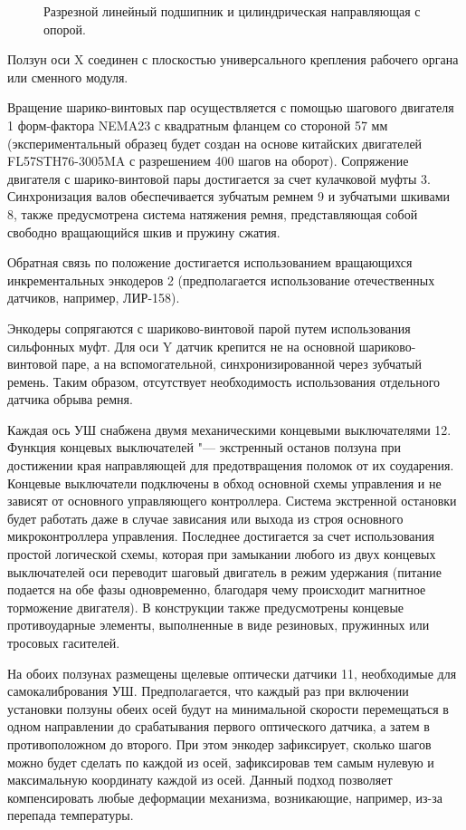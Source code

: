 \begin{figure}[ht]
	\caption{Разрезной линейный подшипник и цилиндрическая направляющая с опорой.}\label{fig:bearing}
\end{figure}

Ползун оси X соединен с плоскостью универсального крепления рабочего органа или сменного модуля.

Вращение шарико-винтовых пар осуществляется с помощью шагового двигателя 1 форм-фактора NEMA23 с квадратным фланцем со стороной 57 мм (экспериментальный образец будет создан на основе китайских двигателей FL57STH76-3005MA с разрешением 400 шагов на оборот). Сопряжение двигателя с шарико-винтовой пары достигается за счет кулачковой муфты 3. Синхронизация валов обеспечивается зубчатым ремнем 9 и зубчатыми шкивами 8, также предусмотрена система натяжения ремня, представляющая собой свободно вращающийся шкив и пружину сжатия.

Обратная связь по положение достигается использованием вращающихся инкрементальных энкодеров 2 (предполагается использование отечественных датчиков, например, ЛИР-158).

Энкодеры сопрягаются с шариково-винтовой парой путем использования сильфонных муфт. Для оси Y датчик крепится не на основной шариково-винтовой паре, а на вспомогательной, синхронизированной через зубчатый ремень. Таким образом, отсутствует необходимость использования отдельного датчика обрыва ремня. 

Каждая ось УШ снабжена двумя механическими концевыми выключателями 12. Функция концевых выключателей "--- экстренный останов ползуна при достижении края направляющей для предотвращения поломок от их соударения. Концевые выключатели подключены в обход основной схемы управления и не зависят от основного управляющего контроллера. Система экстренной остановки будет работать даже в случае зависания или выхода из строя основного микроконтроллера управления. Последнее достигается за счет использования простой логической схемы, которая при замыкании любого из двух концевых выключателей оси переводит шаговый двигатель в режим удержания (питание подается на обе фазы одновременно, благодаря чему происходит магнитное торможение двигателя). В конструкции также предусмотрены концевые противоударные элементы, выполненные в виде резиновых, пружинных или тросовых гасителей.

На обоих ползунах размещены щелевые оптически датчики 11, необходимые для самокалибрования УШ. Предполагается, что каждый раз при включении установки ползуны обеих осей будут на минимальной скорости перемещаться в одном направлении до срабатывания первого оптического датчика, а затем в противоположном до второго. При этом энкодер зафиксирует, сколько шагов можно будет сделать по каждой из осей, зафиксировав тем самым нулевую и максимальную координату каждой из осей. Данный подход позволяет компенсировать любые деформации механизма, возникающие, например, из-за перепада температуры.

